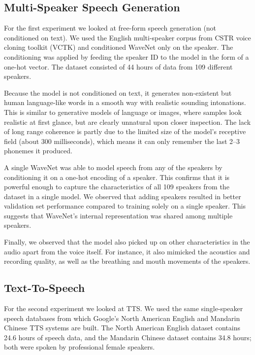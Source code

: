 \documentclass{article}
\begin{document}
\subsection{Multi-Speaker Speech Generation}

For the first experiment we looked at free-form speech generation (not conditioned on text). We used the English multi-speaker corpus from CSTR voice cloning toolkit (VCTK) \citep{VCTK} and conditioned WaveNet only on the speaker. The conditioning was applied by feeding the speaker ID to the model in the form of a one-hot vector. The dataset consisted of 44 hours of data from 109 different speakers.

Because the model is not conditioned on text, it generates non-existent but human language-like words in a smooth way with realistic sounding intonations. This is similar to generative models of language or images, where samples look realistic at first glance, but are clearly unnatural upon closer inspection. The lack of long range coherence is partly due to the limited size of the model's receptive field (about 300 milliseconds), which means it can only remember the last 2--3 phonemes it produced.

A single WaveNet was able to model speech from any of the speakers by conditioning it on a one-hot encoding of a speaker. This confirms that it is powerful enough to capture the characteristics of all 109 speakers from the dataset in a single model. We observed that adding speakers resulted in better validation set performance compared to training solely on a single speaker. This suggests that WaveNet's internal representation was shared among multiple speakers.

Finally, we observed that the model also picked up on other characteristics in the audio apart from the voice itself. For instance, it also mimicked the acoustics and recording quality, as well as the breathing and mouth movements of the speakers.

\subsection{Text-To-Speech}
For the second experiment we looked at TTS.  
We used the same single-speaker speech databases from which Google's North American English and Mandarin Chinese TTS systems are built.
The North American English dataset contains 24.6 hours of speech data, and the Mandarin Chinese dataset contains 34.8 hours; both were spoken by professional female speakers.
\end{document}
